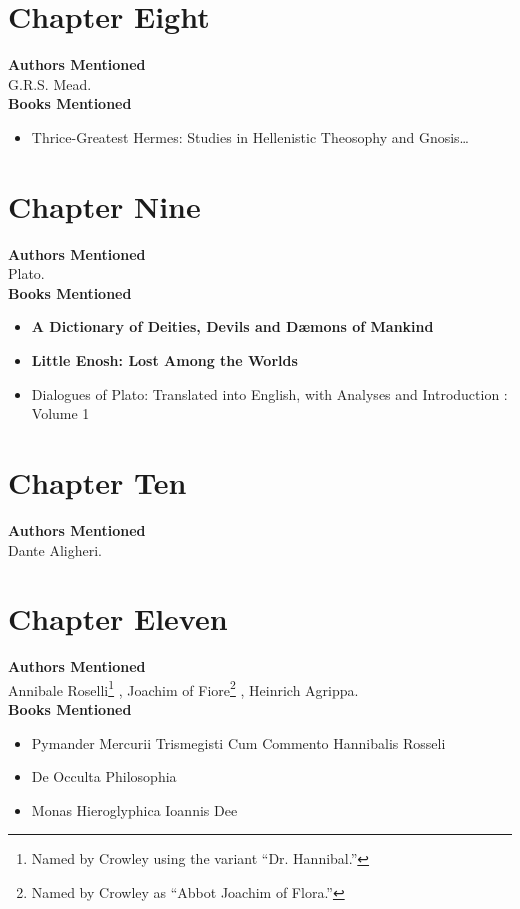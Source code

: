 \documentclass[12pt,makeidx]{extreport}
\begin{document}
\section{Chapter Eight}
\textbf{Authors Mentioned}\\
G.R.S. Mead.
\\

\hspace{-1.5em}\textbf{Books Mentioned}
\begin{itemize}
\item Thrice-Greatest Hermes: Studies in Hellenistic Theosophy and Gnosis\ldots \parencite{Mead1906}
\end{itemize}

\section{Chapter Nine}
\textbf{Authors Mentioned}\\
Plato.
\\

\hspace{-1.5em}\textbf{Books Mentioned}
\begin{itemize}
\item \textbf{A Dictionary of Deities, Devils and Dæmons of Mankind} \parencite{St.Phalle}
\item \textbf{Little Enosh: Lost Among the Worlds} \parencite{enosh}
\item Dialogues of Plato: Translated into English, with Analyses and Introduction : Volume 1 \parencite{Jowett1871}
\end{itemize}

\section{Chapter Ten}
\textbf{Authors Mentioned}\\
Dante Aligheri.

\section{Chapter Eleven}
\textbf{Authors Mentioned}\\
Annibale Roselli\footnote{Named by Crowley using the variant ``Dr. Hannibal.''} , Joachim of Fiore\footnote{Named by Crowley as ``Abbot Joachim of Flora.''} , Heinrich Agrippa.
\\

\hspace{-1.5em}\textbf{Books Mentioned}
\begin{itemize}
\item Pymander Mercurii Trismegisti Cum Commento Hannibalis Rosseli \parencite{Rosselli1585}
\item De Occulta Philosophia \parencite{Nettesheim1565}
\item Monas Hieroglyphica Ioannis Dee \parencite{Dee1564}
\end{itemize}
\end{document}
